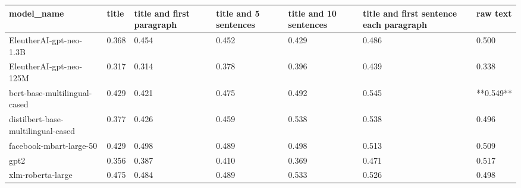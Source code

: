 \begin{tabular}{lllllll}
\toprule
                        model\_name & title & title and first paragraph & title and 5 sentences & title and 10 sentences & title and first sentence each paragraph &  raw text \\
\midrule
           EleutherAI-gpt-neo-1.3B & 0.368 &                     0.454 &                 0.452 &                  0.429 &                                   0.486 &     0.500 \\
           EleutherAI-gpt-neo-125M & 0.317 &                     0.314 &                 0.378 &                  0.396 &                                   0.439 &     0.338 \\
      bert-base-multilingual-cased & 0.429 &                     0.421 &                 0.475 &                  0.492 &                                   0.545 & **0.549** \\
distilbert-base-multilingual-cased & 0.377 &                     0.426 &                 0.459 &                  0.538 &                                   0.538 &     0.496 \\
           facebook-mbart-large-50 & 0.429 &                     0.498 &                 0.489 &                  0.498 &                                   0.513 &     0.509 \\
                              gpt2 & 0.356 &                     0.387 &                 0.410 &                  0.369 &                                   0.471 &     0.517 \\
                 xlm-roberta-large & 0.475 &                     0.484 &                 0.489 &                  0.533 &                                   0.526 &     0.498 \\
\bottomrule
\end{tabular}
